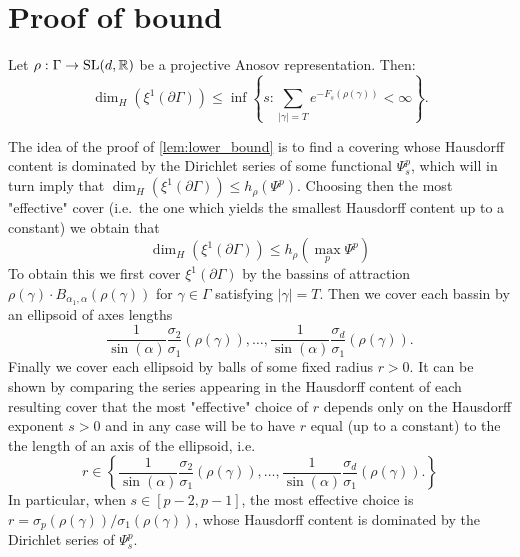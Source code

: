 \documentclass{report}
\begin{document}
\section{Proof of bound}
\begin{lemma}\label{lem:upper_bound}
Let $\rho: \Gamma \to \operatorname{{\mathrm{SL}}}(d, \mathbb R)$ be a projective Anosov representation. 
Then:
\[
    \dim_H(\xi^1 (\partial \Gamma) ) \leq
    \inf 
    \left\{ 
        s :  
        \sum_{|\gamma| = T} e^{-F_s(\rho(\gamma))}  < \infty
    \right\}.
\]
\end{lemma}
\begin{remark}
    The idea of the proof of \cref*{lem:lower_bound} is to find a covering whose Hausdorff content is dominated by the Dirichlet series of some functional $\Psi_s^p$, which will in turn imply that $\dim_H(\xi^1(\partial \Gamma)) \leq h_\rho(\Psi^p) $.
    Choosing then the most "effective" cover (i.e.\ the one which yields the smallest Hausdorff content up to a constant) we obtain that
    \[
        \dim_H(\xi^1(\partial \Gamma)) \leq h_\rho(\max_p \Psi^p)
    \]
    To obtain this we first cover $\xi^1(\partial \Gamma)$ by the bassins of attraction $\rho(\gamma) \cdot B_{\alpha_1, \alpha} (\rho(\gamma))$ for $\gamma \in \Gamma$ satisfying $|\gamma| = T$.
    Then we cover each bassin by an ellipsoid of axes lengths
    \[
        \frac{1}{\sin(\alpha)} \frac{\sigma_2}{\sigma_1}(\rho(\gamma)), \ldots, 
        \frac{1}{\sin(\alpha)} \frac{\sigma_d}{\sigma_1}(\rho(\gamma)).
    \]
    Finally we cover each ellipsoid by balls of some fixed radius $r>0$.
    It can be shown by comparing the series appearing in the Hausdorff content of each resulting cover that the most "effective" choice of $r$ depends only on the Hausdorff exponent $s > 0$ and in any case will be to have $r$ equal (up to a constant) to the the length of an axis of the ellipsoid, i.e.\
    \[
        r \in \left\{
            \frac{1}{\sin(\alpha)} \frac{\sigma_2}{\sigma_1}(\rho(\gamma)), \ldots, 
            \frac{1}{\sin(\alpha)} \frac{\sigma_d}{\sigma_1}(\rho(\gamma)).    
        \right\}
    \]
    In particular, when $s \in [p-2, p-1]$, the most effective choice is $r = \sigma_p(\rho(\gamma))/\sigma_1(\rho(\gamma))$, whose Hausdorff content is dominated by the Dirichlet series of $\Psi_s^p$.
\end{remark}
\end{document}
